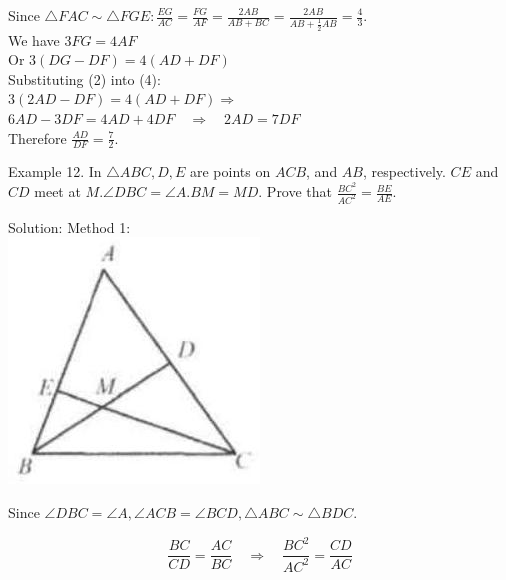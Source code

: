 \documentclass[10pt]{article}
\begin{document}
Since \(\triangle F A C \sim \triangle F G E: \frac{E G}{A C}=\frac{F G}{A F}=\frac{2 A B}{A B+B C}=\frac{2 A B}{A B+\frac{1}{2} A B}=\frac{4}{3}\).\\
We have \(3 F G=4 A F\)\\
Or \(3(D G-D F)=4(A D+D F)\)\\
Substituting (2) into (4):\\
\(3(2 A D-D F)=4(A D+D F) \Rightarrow\)\\
\(6 A D-3 D F=4 A D+4 D F \quad \Rightarrow \quad 2 A D=7 D F\)\\
Therefore \(\frac{A D}{D F}=\frac{7}{2}\).


Example 12. In \(\triangle A B C, D, E\) are points on \(A C B\), and \(A B\), respectively. \(C E\) and \(C D\) meet at \(M . \angle D B C=\angle A . B M=M D\). Prove that \(\frac{B C^{2}}{A C^{2}}=\frac{B E}{A E}\).

Solution:
Method 1:\\
\includegraphics[max width=\textwidth, center]{2025_04_17_97bc1f7e44d93c271a88g-115}

Since \(\angle D B C=\angle A, \angle A C B=\angle B C D, \triangle A B C \sim \triangle B D C\).

\[
\frac{B C}{C D}=\frac{A C}{B C} \quad \Rightarrow \quad \frac{B C^{2}}{A C^{2}}=\frac{C D}{A C}
\]
\end{document}
